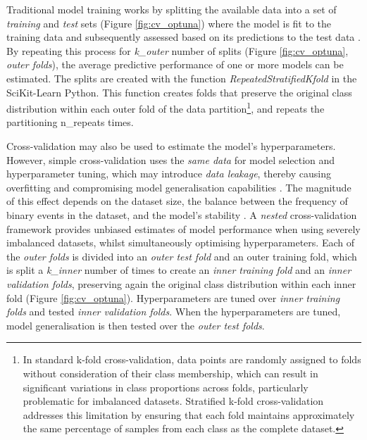 Traditional  model training works by splitting the available data into a set of \textcolor{colourTraining}{\textit{training}} and \textcolor{colourTest}{\textit{test}} sets (Figure \ref{fig:cv_optuna}) where the model is fit to the training data and subsequently assessed based on its predictions to the test data \citep{Hastie_2009}. By repeating this process for \textit{k\_outer} number of splits (Figure \ref{fig:cv_optuna}, \textcolor{colourOuterFolds}{\textit{outer folds}}), the average predictive performance of one or more models can be estimated. The splits are created with the function \textit{RepeatedStratifiedKfold} in the SciKit-Learn Python. This function creates folds that preserve the original class distribution within each outer fold of the data partition\footnote{In standard k-fold cross-validation, data points are randomly assigned to folds without consideration of their class membership, which can result in significant variations in class proportions across folds, particularly problematic for imbalanced datasets. Stratified k-fold cross-validation addresses this limitation by ensuring that each fold maintains approximately the same percentage of samples from each class as the complete dataset.}, and repeats the partitioning n\_repeats times. 

Cross-validation  may also be used to estimate the model's hyperparameters. However, simple cross-validation uses the \textit{same data} for model selection and hyperparameter tuning, which may introduce \textit{data leakage}, thereby causing overfitting and compromising model generalisation capabilities \citep{Sasse_2025}. The magnitude of this effect depends on the dataset size, the balance between the frequency of binary events in the dataset, and the model's stability \citep{Sasse_2025}. A \textit{nested} cross-validation framework provides unbiased estimates of model performance when using severely imbalanced datasets, whilst simultaneously optimising hyperparameters. Each of the \textcolor{colourOuterFolds}{\textit{outer folds}} is divided into an \textcolor{colourOuterTest}{\textit{outer test fold}} and an outer training fold, which is split a \textit{k\_inner} number of times to create an \textcolor{colourInnerTraining}{\textit{inner training fold}} and an \textcolor{colourInnerValidation}{\textit{inner validation folds}}, preserving again the original class distribution within each inner fold (Figure \ref{fig:cv_optuna}). Hyperparameters are tuned over \textcolor{colourInnerTraining}{\textit{inner training folds}} and tested \textcolor{colourInnerValidation}{\textit{inner validation folds}}. When the hyperparameters are tuned, model generalisation is then tested over the \textcolor{colourOuterTest}{\textit{outer test folds}}.

